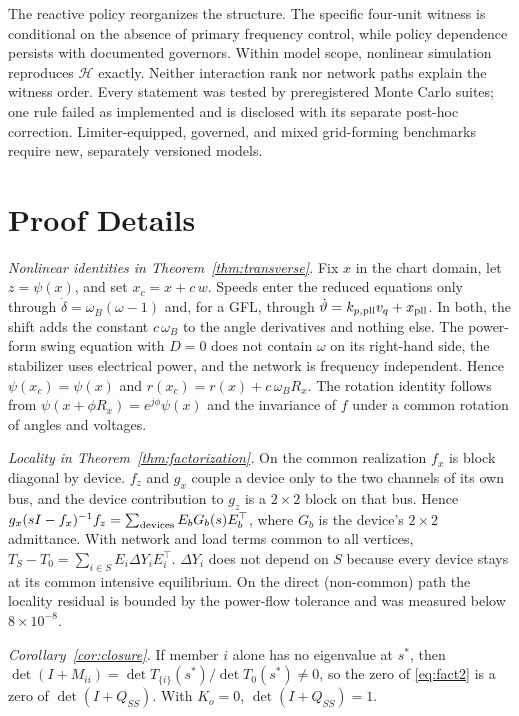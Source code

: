 \documentclass[journal]{IEEEtran}
\theoremstyle{definition}
\theoremstyle{remark}
\newcommand{\Hy}{\mathcal{H}}
\begin{document}
The reactive policy reorganizes the structure. The specific four-unit witness
is conditional on the absence of primary frequency control, while policy
dependence persists with documented governors. Within model scope, nonlinear
simulation reproduces $\Hy$ exactly. Neither interaction rank nor network paths
explain the witness order. Every statement was tested by preregistered Monte
Carlo suites; one rule failed as implemented and is disclosed with its
separate post-hoc correction. Limiter-equipped, governed, and mixed grid-forming
benchmarks require new, separately versioned models.

\appendices
\section{Proof Details}\label{app:proofs}
\emph{Nonlinear identities in Theorem~\ref{thm:transverse}.} Fix $x$ in the
chart domain, let $z=\psi(x)$, and set $x_c=x+c\,w$. Speeds enter the reduced
equations only through $\dot\delta=\omega_B(\omega-1)$ and, for a GFL, through
$\dot\vartheta=k_{p,\rm pll}v_q+x_{\rm pll}$. In both, the shift adds the
constant $c\,\omega_B$ to the angle derivatives and nothing else. The
power-form swing equation with $D=0$ does not contain $\omega$ on its
right-hand side, the stabilizer uses electrical power, and the network is
frequency independent. Hence $\psi(x_c)=\psi(x)$ and
$r(x_c)=r(x)+c\,\omega_BR_x$. The rotation identity follows from
$\psi(x+\phi R_x)=e^{j\phi}\psi(x)$ and the invariance of $f$ under a common
rotation of angles and voltages.

\emph{Locality in Theorem~\ref{thm:factorization}.} On the common realization
$f_x$ is block diagonal by device. $f_z$ and $g_x$ couple a device only to the
two channels of its own bus, and the device contribution to $g_z$ is a
$2\times2$ block on that bus. Hence
$g_x(sI-f_x)^{-1}f_z=\sum_{\rm devices}E_bG_b(s)E_b^\top$, where $G_b$ is the
device's $2\times2$ admittance. With network and load terms common to all
vertices, $T_S-T_0=\sum_{i\in S}E_i\Delta Y_iE_i^\top$. $\Delta Y_i$ does not
depend on $S$ because every device stays at its common intensive equilibrium.
On the direct (non-common) path the locality residual is bounded by the
power-flow tolerance and was measured below $8\times10^{-8}$.

\emph{Corollary~\ref{cor:closure}.} If member $i$ alone has no eigenvalue at
$s^*$, then $\det(I+M_{ii})=\det T_{\{i\}}(s^*)/\det T_0(s^*)\neq0$, so the
zero of \eqref{eq:fact2} is a zero of $\det(I+Q_{SS})$. With $K_o=0$,
$\det(I+Q_{SS})=1$.
\end{document}
